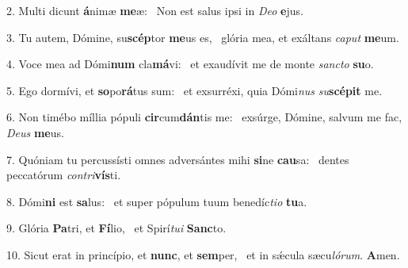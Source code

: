 2. Multi dicunt \textbf{á}nimæ \textbf{me}æ: \ast\  Non est salus ipsi in \textit{De}\textit{o} \textbf{e}jus.\

3. Tu autem, Dómine, su\textbf{scép}tor \textbf{me}us es, \ast\  glória mea, et exáltans \textit{ca}\textit{put} \textbf{me}um.\

4. Voce mea ad Dómi\textbf{num} cla\textbf{má}vi: \ast\  et exaudívit me de monte \textit{sanc}\textit{to} \textbf{su}o.\

5. Ego dormívi, et \textbf{so}po\textbf{rá}tus sum: \ast\  et exsurréxi, quia Dómi\textit{nus} \textit{su}\textbf{scé}\textbf{pit} me.\

6. Non timébo míllia pópuli \textbf{cir}cum\textbf{dán}tis me: \ast\  exsúrge, Dómine, salvum me fac, \textit{De}\textit{us} \textbf{me}us.\

7. Quóniam tu percussísti omnes adversántes mihi \textbf{si}ne \textbf{cau}sa: \ast\  dentes peccatórum \textit{con}\textit{tri}\textbf{vís}ti.\

8. Dómi\textbf{ni} est \textbf{sa}lus: \ast\  et super pópulum tuum benedíc\textit{ti}\textit{o} \textbf{tu}a.\

9. Glória \textbf{Pa}tri, et \textbf{Fí}lio, \ast\  et Spirí\textit{tu}\textit{i} \textbf{Sanc}to.\

10. Sicut erat in princípio, et \textbf{nunc}, et \textbf{sem}per, \ast\  et in sǽcula sæcu\textit{ló}\textit{rum}. \textbf{A}men.\

